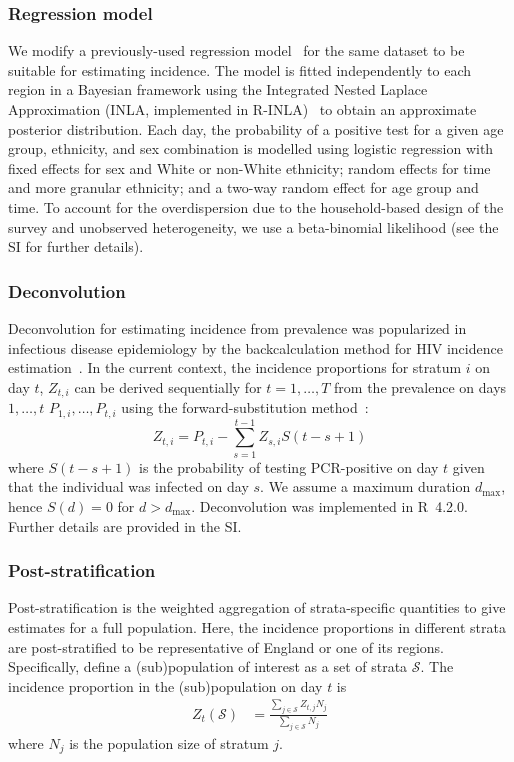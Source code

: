 \documentclass[9pt,twocolumn,twoside]{pnas-new}
\newcommand{\dmax}{d_\text{max}}
\newcommand\set{\mathcal}
\begin{document}
{\subsubsection*{Regression model}
We modify a previously-used regression model~\citep{pouwelsMRPvaccination} for the same dataset to be suitable for estimating incidence.
The model is fitted independently to each region in a Bayesian framework using the Integrated Nested Laplace Approximation (INLA, implemented in R-INLA)~\citep{RINLA,rueINLA} to obtain an approximate posterior distribution.
Each day, the probability of a positive test for a given age group, ethnicity, and sex combination is modelled using logistic regression with fixed effects for sex and White or non-White ethnicity; random effects for time and more granular ethnicity; and a two-way random effect for age group and time.
To account for the overdispersion due to the household-based design of the survey and unobserved heterogeneity, we use a beta-binomial likelihood (see the SI for further details).

\subsubsection*{Deconvolution}

Deconvolution for estimating incidence from prevalence was popularized in infectious disease epidemiology by the backcalculation method for HIV incidence estimation~\citep{brookmeyerBackcalculation}.
In the current context, the incidence proportions for stratum $i$ on day $t$, $Z_{t,i}$ can be derived sequentially for $t = 1, \dots, T$ from the prevalence on days $1, \dots, t$ $P_{1,i}, \dots, P_{t,i}$ using the forward-substitution method~\citep{cormenMatrix}:
\begin{equation}
    Z_{t,i} = P_{t,i} - \sum_{s=1}^{t-1} Z_{s,i} S(t-s+1)
    \label{eq:deconv}
\end{equation}
where $S(t-s+1)$ is the probability of testing PCR-positive on day $t$ given that the individual was infected on day $s$.
We assume a maximum duration $\dmax$, hence $S(d) = 0$ for $d > \dmax$.
Deconvolution was implemented in R~4.2.0.
Further details are provided in the SI.

\subsubsection*{Post-stratification}
Post-stratification is the weighted aggregation of strata-specific quantities to give estimates for a full population. Here, the incidence proportions in different strata are post-stratified to be representative of England or one of its regions.
Specifically, define a (sub)population of interest as a set of strata $\set{S}$.
The incidence proportion in the (sub)population on day $t$ is
\begin{align}
Z_t(\set{S})
&= \frac{\sum_{j \in \set{S}} Z_{t, j} N_j}{\sum_{j \in \set{S}} N_j}
\label{backcalc:eq:poststratify}
\end{align}
where $N_j$ is the population size of stratum $j$.

}
\end{document}
